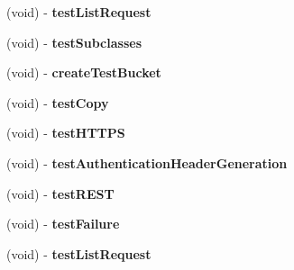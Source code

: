 \begin{DoxyCompactItemize}
\item 
\hypertarget{interface_a_s_i_s3_request_tests_adf56486c5a0e74cfdf0711c5fa016fb9}{
(void) -\/ {\bfseries test\-List\-Request}}
\label{interface_a_s_i_s3_request_tests_adf56486c5a0e74cfdf0711c5fa016fb9}

\item 
\hypertarget{interface_a_s_i_s3_request_tests_a7d8d7e21e0b483ca67889868688adb7d}{
(void) -\/ {\bfseries test\-Subclasses}}
\label{interface_a_s_i_s3_request_tests_a7d8d7e21e0b483ca67889868688adb7d}

\item 
\hypertarget{interface_a_s_i_s3_request_tests_a8cc7c1272f528811ee7d8f5e07fb1133}{
(void) -\/ {\bfseries create\-Test\-Bucket}}
\label{interface_a_s_i_s3_request_tests_a8cc7c1272f528811ee7d8f5e07fb1133}

\item 
\hypertarget{interface_a_s_i_s3_request_tests_a47ba82f8750aba0ef3928d442442e5c8}{
(void) -\/ {\bfseries test\-Copy}}
\label{interface_a_s_i_s3_request_tests_a47ba82f8750aba0ef3928d442442e5c8}

\item 
\hypertarget{interface_a_s_i_s3_request_tests_ab3c1fecc3be8fa9465a8e7a20de1f49e}{
(void) -\/ {\bfseries test\-H\-T\-T\-P\-S}}
\label{interface_a_s_i_s3_request_tests_ab3c1fecc3be8fa9465a8e7a20de1f49e}

\item 
\hypertarget{interface_a_s_i_s3_request_tests_a60bdada8e76611d7d565dff4b2cfd8a9}{
(void) -\/ {\bfseries test\-Authentication\-Header\-Generation}}
\label{interface_a_s_i_s3_request_tests_a60bdada8e76611d7d565dff4b2cfd8a9}

\item 
\hypertarget{interface_a_s_i_s3_request_tests_a8ca48a7b94614a7026f7b7862b722f89}{
(void) -\/ {\bfseries test\-R\-E\-S\-T}}
\label{interface_a_s_i_s3_request_tests_a8ca48a7b94614a7026f7b7862b722f89}

\item 
\hypertarget{interface_a_s_i_s3_request_tests_a91778029a97f36e77dad559977cdb550}{
(void) -\/ {\bfseries test\-Failure}}
\label{interface_a_s_i_s3_request_tests_a91778029a97f36e77dad559977cdb550}

\item 
\hypertarget{interface_a_s_i_s3_request_tests_adf56486c5a0e74cfdf0711c5fa016fb9}{
(void) -\/ {\bfseries test\-List\-Request}}
\label{interface_a_s_i_s3_request_tests_adf56486c5a0e74cfdf0711c5fa016fb9}


\end{DoxyCompactItemize}
